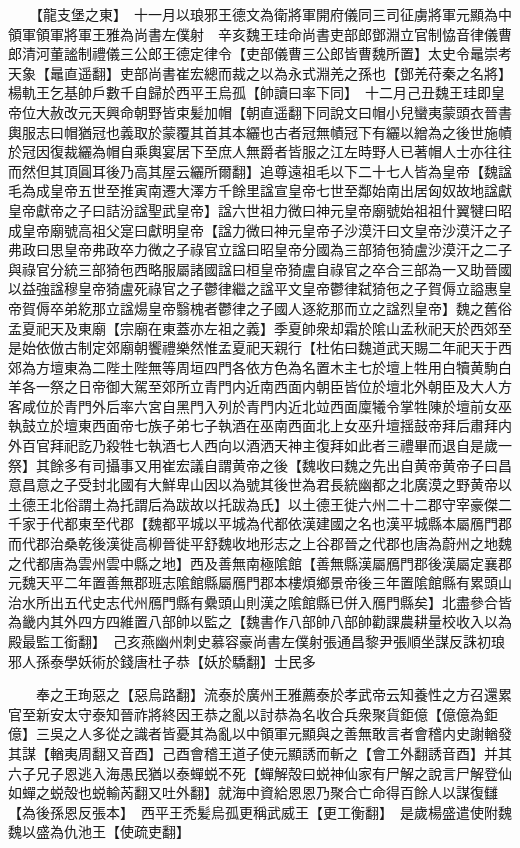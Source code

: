 　　【龍支堡之東】　十一月以琅邪王德文為衛將軍開府儀同三司征虜將軍元顯為中領軍領軍將軍王雅為尚書左僕射　辛亥魏王珪命尚書吏部郎鄧淵立官制恊音律儀曹郎清河董謐制禮儀三公郎王德定律令【吏部儀曹三公郎皆曹魏所置】太史令鼂崇考天象【鼂直遥翻】吏部尚書崔宏總而裁之以為永式淵羌之孫也【鄧羌苻秦之名將】　楊軌王乞基帥戶數千自歸於西平王烏孤【帥讀曰率下同】　十二月己丑魏王珪即皇帝位大赦改元天興命朝野皆束髪加帽【朝直遥翻下同說文曰帽小兒蠻夷蒙頭衣晉書輿服志曰帽猶冠也義取於蒙覆其首其本纚也古者冠無幘冠下有纚以繒為之後世施幘於冠因復裁纚為帽自乘輿宴居下至庶人無爵者皆服之江左時野人已著帽人士亦往往而然但其頂圓耳後乃高其屋云纚所爾翻】追尊遠祖毛以下二十七人皆為皇帝【魏諡毛為成皇帝五世至推寅南遷大澤方千餘里諡宣皇帝七世至鄰始南出居匈奴故地諡獻皇帝獻帝之子曰詰汾諡聖武皇帝】諡六世祖力微曰神元皇帝廟號始祖祖什翼犍曰昭成皇帝廟號高祖父寔曰獻明皇帝【諡力微曰神元皇帝子沙漠汗曰文皇帝沙漠汗之子弗政曰思皇帝弗政卒力微之子祿官立諡曰昭皇帝分國為三部猗㐌猗盧沙漠汗之二子與祿官分統三部猗㐌西略服屬諸國諡曰桓皇帝猗盧自祿官之卒合三部為一又助晉國以益強諡穆皇帝猗盧死祿官之子鬱律繼之諡平文皇帝鬱律弑猗㐌之子賀傉立謚惠皇帝賀傉卒弟紇那立諡煬皇帝翳槐者鬱律之子國人逐紇那而立之諡烈皇帝】魏之舊俗孟夏祀天及東廟【宗廟在東蓋亦左祖之義】季夏帥衆却霜於隂山孟秋祀天於西郊至是始依倣古制定郊廟朝饗禮樂然惟孟夏祀天親行【杜佑曰魏道武天賜二年祀天于西郊為方壇東為二陛土陛無等周垣四門各依方色為名置木主七於壇上牲用白犢黄駒白羊各一祭之日帝御大駕至郊所立青門内近南西面内朝臣皆位於壇北外朝臣及大人方客咸位於青門外后率六宮自黑門入列於青門内近北竝西面廩犧令掌牲陳於壇前女巫執鼓立於壇東西面帝七族子弟七子執酒在巫南西面北上女巫升壇揺鼓帝拜后肅拜内外百官拜祀訖乃殺牲七執酒七人西向以酒洒天神主復拜如此者三禮畢而退自是歲一祭】其餘多有司攝事又用崔宏議自謂黄帝之後【魏收曰魏之先出自黄帝黄帝子曰昌意昌意之子受封北國有大鮮卑山因以為號其後世為君長統幽都之北廣漠之野黄帝以土德王北俗謂土為托謂后為跋故以托跋為氏】以土德王徙六州二十二郡守宰豪傑二千家于代都東至代郡【魏都平城以平城為代都依漢建國之名也漢平城縣本屬鴈門郡而代郡治桑乾後漢徙高柳晉徙平舒魏收地形志之上谷郡晉之代郡也唐為蔚州之地魏之代都唐為雲州雲中縣之地】西及善無南極隂館【善無縣漢屬鴈門郡後漢屬定襄郡元魏天平二年置善無郡班志隂館縣屬鴈門郡本樓煩鄉景帝後三年置隂館縣有累頭山治水所出五代史志代州鴈門縣有纍頭山則漢之隂館縣已併入鴈門縣矣】北盡參合皆為畿内其外四方四維置八部帥以監之【魏書作八部帥八部帥勸課農耕量校收入以為殿最監工銜翻】　己亥燕幽州刺史慕容豪尚書左僕射張通昌黎尹張順坐謀反誅初琅邪人孫泰學妖術於錢唐杜子恭【妖於驕翻】士民多

　　奉之王珣惡之【惡烏路翻】流泰於廣州王雅薦泰於孝武帝云知養性之方召還累官至新安太守泰知晉祚將終因王恭之亂以討恭為名收合兵衆聚貨鉅億【億億為鉅億】三吳之人多從之識者皆憂其為亂以中領軍元顯與之善無敢言者會稽内史謝輶發其謀【輶夷周翻又音酉】己酉會稽王道子使元顯誘而斬之【會工外翻誘音酉】并其六子兄子恩逃入海愚民猶以泰蟬蜕不死【蟬解殻曰蜕神仙家有尸解之說言尸解登仙如蟬之蜕殻也蜕輸芮翻又吐外翻】就海中資給恩恩乃聚合亡命得百餘人以謀復讎【為後孫恩反張本】　西平王禿髪烏孤更稱武威王【更工衡翻】　是歲楊盛遣使附魏魏以盛為仇池王【使疏吏翻】

